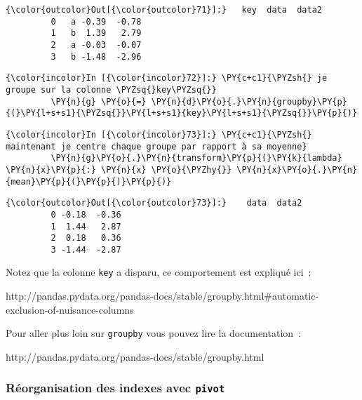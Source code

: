 \begin{Verbatim}[commandchars=\\\{\},frame=single,framerule=0.3mm,rulecolor=\color{cellframecolor}]
{\color{outcolor}Out[{\color{outcolor}71}]:}   key  data  data2
         0   a -0.39  -0.78
         1   b  1.39   2.79
         2   a -0.03  -0.07
         3   b -1.48  -2.96
\end{Verbatim}
            
    \begin{Verbatim}[commandchars=\\\{\},frame=single,framerule=0.3mm,rulecolor=\color{cellframecolor}]
{\color{incolor}In [{\color{incolor}72}]:} \PY{c+c1}{\PYZsh{} je groupe sur la colonne \PYZsq{}key\PYZsq{}}
         \PY{n}{g} \PY{o}{=} \PY{n}{d}\PY{o}{.}\PY{n}{groupby}\PY{p}{(}\PY{l+s+s1}{\PYZsq{}}\PY{l+s+s1}{key}\PY{l+s+s1}{\PYZsq{}}\PY{p}{)}
\end{Verbatim}


    \begin{Verbatim}[commandchars=\\\{\},frame=single,framerule=0.3mm,rulecolor=\color{cellframecolor}]
{\color{incolor}In [{\color{incolor}73}]:} \PY{c+c1}{\PYZsh{} maintenant je centre chaque groupe par rapport à sa moyenne}
         \PY{n}{g}\PY{o}{.}\PY{n}{transform}\PY{p}{(}\PY{k}{lambda} \PY{n}{x}\PY{p}{:} \PY{n}{x} \PY{o}{\PYZhy{}} \PY{n}{x}\PY{o}{.}\PY{n}{mean}\PY{p}{(}\PY{p}{)}\PY{p}{)}
\end{Verbatim}


\begin{Verbatim}[commandchars=\\\{\},frame=single,framerule=0.3mm,rulecolor=\color{cellframecolor}]
{\color{outcolor}Out[{\color{outcolor}73}]:}    data  data2
         0 -0.18  -0.36
         1  1.44   2.87
         2  0.18   0.36
         3 -1.44  -2.87
\end{Verbatim}
            
    Notez que la colonne \texttt{key} a disparu, ce comportement est
expliqué ici~:

http://pandas.pydata.org/pandas-docs/stable/groupby.html\#automatic-exclusion-of-nuisance-columns

Pour aller plus loin sur \texttt{groupby} vous pouvez lire la
documentation~:

http://pandas.pydata.org/pandas-docs/stable/groupby.html

    \hypertarget{ruxe9organisation-des-indexes-avec-pivot}{%
\subsubsection{\texorpdfstring{Réorganisation des indexes avec
\texttt{pivot}}{Réorganisation des indexes avec pivot}}\label{ruxe9organisation-des-indexes-avec-pivot}}

